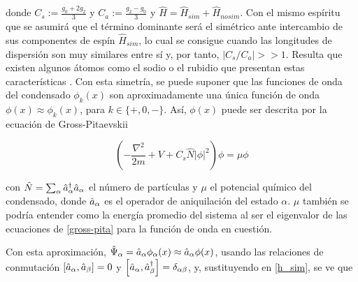 donde $C_s := \frac{g_0 + 2g_2}{3}$ y $C_a := \frac{g_2 - g_0}{3}$ y $\hat{H} = \hat{H}_{sim} + \hat{H}_{nosim}$. Con el mismo espíritu que \cite{law98} se asumirá que el término dominante será el simétrico ante intercambio de sus componentes de espín $\hat{H}_{sim}$, lo cual se consigue cuando las longitudes de dispersión son muy similares entre sí y, por tanto, $|C_s/C_a| >> 1$. Resulta que existen algunos átomos como el sodio o el rubidio que presentan estas características  \cite{sim_scatt_length}. Con esta simetría, se puede suponer que las funciones de onda del condensado $\phi_k(x)$ son aproximadamente una única función de onda $\phi(x) \approx \phi_k(x)$, para $k \in \{ +,0,- \}$. Así, $\phi(x)$ puede ser descrita por la ecuación de Gross-Pitaevskii

\begin{equation}
\left(-\frac{\nabla^2}{2m} + V + C_s\hat{N}|\phi|^2 \right)\phi = \mu \phi
\label{gross-pita}
\end{equation}

con $\hat{N}= \sum_\alpha \hat{a}_{\alpha}^{\dagger} \hat{a}_{\alpha}$ el número de partículas y $\mu$ el potencial químico del condensado, donde $\hat{a}_{\alpha}$ es el operador de aniquilación del estado $\alpha$. $\mu$ también se podría entender como la energía promedio del sistema al ser el eigenvalor de las ecuaciones de \ref{gross-pita} para la función de onda en cuestión. 


Con esta aproximación, $\hat{\Psi}_{\alpha} = \hat{a}_{\alpha} \phi_\alpha(x) \approx \hat{a}_{\alpha} \phi(x)$, usando las relaciones de conmutación $\left[\hat{a}_{\alpha},\hat{a}_{\beta}\right] = 0$ y $\left[\hat{a}_{\alpha},\hat{a}_{\beta}^{\dagger}\right] = \delta_{\alpha\beta}$, y, sustituyendo en \ref{h_sim}, se ve que

